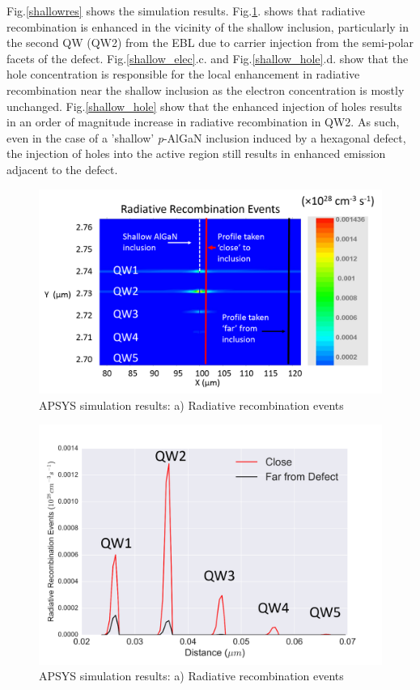 Fig.\ref{shallowres} shows the simulation results. Fig.\ref{shallow_big}. shows that radiative recombination is enhanced in the vicinity of the shallow inclusion, particularly in the second QW (QW2) from the EBL due to carrier injection from the semi-polar facets of the defect. Fig.\ref{shallow_elec}.c. and Fig.\ref{shallow_hole}.d. show that the hole concentration is responsible for the local enhancement in radiative recombination near the shallow inclusion as the electron concentration is mostly unchanged. Fig.\ref{shallow_hole} show that the enhanced injection of holes results in an order of magnitude increase in radiative recombination in QW2. As such, even in the case of a 'shallow' \textit{p}-AlGaN inclusion induced by a hexagonal defect, the injection of holes into the active region still results in enhanced emission adjacent to the defect.
\begin{figure}[h]
	\centering
	\includegraphics[width=1\textwidth]{Figs/Ch3/shallowrad1-1.png}
	\caption[h] {APSYS simulation results: a) Radiative recombination events}
	\label{shallow_big}
\end{figure}
\FloatBarrier 

\begin{figure}[h]
	\centering
	\includegraphics[width=1\textwidth]{Figs/Ch3/shallowrad.png}
	\caption[h] {APSYS simulation results: a) Radiative recombination events}
	\label{shallow_rad}
\end{figure}
\FloatBarrier 

